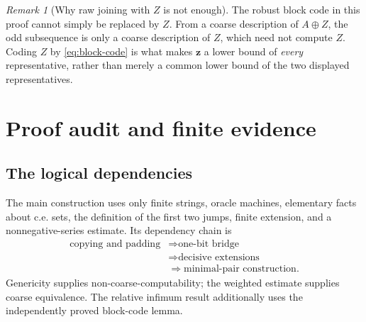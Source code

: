 \documentclass[11pt,a4paper]{article}
\theoremstyle{definition}
\theoremstyle{remark}
\newtheorem{remark}[theorem]{Remark}
\begin{document}
\begin{remark}[Why raw joining with $Z$ is not enough]
The robust block code in this proof cannot simply be replaced by $Z$. From a coarse description of $A\oplus Z$, the odd subsequence is only a coarse description of $Z$, which need not compute $Z$. Coding $Z$ by \eqref{eq:block-code} is what makes $\mathbf z$ a lower bound of \emph{every} representative, rather than merely a common lower bound of the two displayed representatives.
\end{remark}

\section{Proof audit and finite evidence}\label{sec:audit}
\subsection{The logical dependencies}
The main construction uses only finite strings, oracle machines, elementary facts about c.e. sets, the definition of the first two jumps, finite extension, and a nonnegative-series estimate. Its dependency chain is
\[
\begin{aligned}
\text{copying and padding}&\Longrightarrow\text{one-bit bridge}\\
&\Longrightarrow\text{decisive extensions}\\
&\Longrightarrow\text{minimal-pair construction}.
\end{aligned}
\]
Genericity supplies non-coarse-computability; the weighted estimate supplies coarse equivalence. The relative infimum result additionally uses the independently proved block-code lemma.
\end{document}

